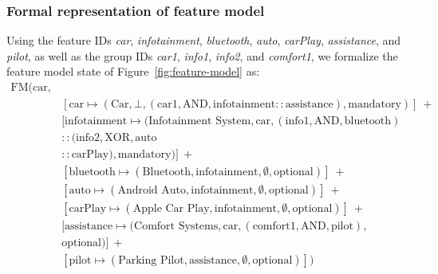 \documentclass[a4paper,english]{ifimaster}
\begin{document}
\subsubsection*{Formal representation of feature model}
Using the feature IDs \emph{car}, \emph{infotainment}, \emph{bluetooth}, \emph{auto}, \emph{carPlay}, \emph{assistance}, and \emph{pilot}, as well as the group IDs \emph{car1}, \emph{info1}, \emph{info2}, and \emph{comfort1}, we formalize the feature model state of Figure~\vref{fig:feature-model} as:
\begin{align*}
    \text{FM}(\text{car}, &\\
    & [\text{car} \mapsto (\text{Car}, \bot , (\text{car1}, \text{AND}, \text{infotainment} :: \text{assistance}), \text{mandatory})]\ +\\
    & [\text{infotainment} \mapsto (\text{Infotainment System}, \text{car}, (\text{info1}, \text{AND}, \text{bluetooth}) \\
    & :: (\text{info2}, \text{XOR}, \text{auto}\\
    & :: \text{carPlay}), \text{mandatory})]\ + \\
    & [\text{bluetooth} \mapsto (\text{Bluetooth}, \text{infotainment}, \emptyset, \text{optional})]\ + \\
    & [\text{auto} \mapsto (\text{Android Auto}, \text{infotainment}, \emptyset, \text{optional})]\ + \\
    & [\text{carPlay} \mapsto (\text{Apple Car Play}, \text{infotainment}, \emptyset, \text{optional})]\ + \\
    & [\text{assistance} \mapsto (\text{Comfort Systems}, \text{car}, (\text{comfort1}, \text{AND}, \text{pilot}), \\ 
    & \text{optional})]\ + \\
    & [\text{pilot} \mapsto  (\text{Parking Pilot}, \text{assistance}, \emptyset, \text{optional})]) 
\end{align*}
\end{document}
